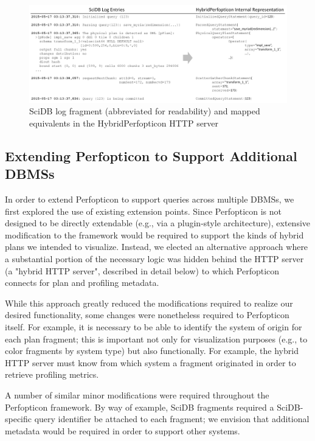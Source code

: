 \documentclass{chi2009}
\begin{document}
\begin{figure}[h]
\begin{center}
\includegraphics[width=\textwidth]{log-representation.png}
\end{center}
\caption{SciDB log fragment (abbreviated for readability) and mapped equivalents in the HybridPerfopticon HTTP server}
\label{fig:scidb-log-example}
\end{figure}

\subsection{Extending Perfopticon to Support Additional DBMSs}

In order to extend Perfopticon to support queries across multiple DBMSs, we first explored the use of existing extension points.  Since Perfopticon is not designed to be directly extendable (e.g., via a plugin-style architecture), extensive modification to the framework would be required to support the kinds of hybrid plans we intended to visualize.  Instead, we elected an alternative approach where a substantial portion of the necessary logic was hidden behind the HTTP server (a "hybrid HTTP server", described in detail below) to which Perfopticon connects for plan and profiling metadata.

While this approach greatly reduced the modifications required to realize our desired functionality, some changes were nonetheless required to Perfopticon itself.  For example, it is necessary to be able to identify the system of origin for each plan fragment; this is important not only for visualization purposes (e.g., to color fragments by system type) but also functionally.  For example, the hybrid HTTP server must know from which system a fragment originated in order to retrieve profiling metrics.

A number of similar minor modifications were required throughout the Perfopticon framework.  By way of example, SciDB fragments required a SciDB-specific query identifier be attached to each fragment; we envision that additional metadata would be required in order to support other systems.
\end{document}
